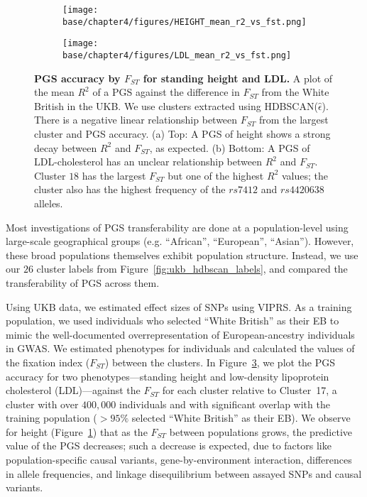 \begin{figure}[ht]
  \centering
  \begin{subfigure}[b]{0.6\linewidth}
    \texttt{[image: base/chapter4/figures/HEIGHT\_mean\_r2\_vs\_fst.png]}
    \caption{}
    \label{fig:fst_vs_r2_height}
  \end{subfigure}
    \begin{subfigure}[b]{0.6\linewidth}
    \texttt{[image: base/chapter4/figures/LDL\_mean\_r2\_vs\_fst.png]}
    \caption{}
    \label{fig:fst_vs_r2_ldl}
  \end{subfigure}
  \caption[PGS accuracy by $F_{ST}$]{\textbf{PGS accuracy by $F_{ST}$ for standing height and LDL.}  A plot of the mean $R^2$ of a PGS against the difference in $F_{ST}$ from the White British in the UKB. We use clusters extracted using HDBSCAN($\hat{\epsilon}$). There is a negative linear relationship between $F_{ST}$ from the largest cluster and PGS accuracy. (a) Top: A PGS of height shows a strong decay between $R^2$ and $F_{ST}$, as expected. (b) Bottom: A PGS of LDL-cholesterol has an unclear relationship between $R^2$ and $F_{ST}$. Cluster $18$ has the largest $F_{ST}$ but one of the highest $R^2$ values; the cluster also has the highest frequency of the $rs7412$ and $rs4420638$ alleles.} 
  \label{fig:fst_vs_r2}
\end{figure}

Most investigations of PGS transferability are done at a population-level using large-scale geographical groups (e.g. ``African'', ``European'', ``Asian''). However, these broad populations themselves exhibit population structure\citep{kamiza_transferability_2022}. Instead, we use our $26$ cluster labels from Figure~\ref{fig:ukb_hdbscan_labels}, and compared the transferability of PGS across them. 

Using UKB data, we estimated effect sizes of SNPs using VIPRS\citep{zabad_fast_2023}. As a training population, we used individuals who selected ``White British'' as their EB to mimic the well-documented overrepresentation of European-ancestry individuals in GWAS. We estimated phenotypes for individuals and calculated the values of the fixation index ($F_{ST}$) between the clusters. In Figure~\ref{fig:fst_vs_r2}, we plot the PGS accuracy for two phenotypes---standing height and low-density lipoprotein cholesterol (LDL)---against the $F_{ST}$ for each cluster relative to Cluster~17, a cluster with over $400,000$ individuals and with significant overlap with the training population ($>95\%$ selected ``White British'' as their EB). We observe for height (Figure~\ref{fig:fst_vs_r2_height}) that as the $F_{ST}$ between populations grows, the predictive value of the PGS decreases; such a decrease is expected, due to factors like population-specific causal variants, gene-by-environment interaction, differences in allele frequencies, and linkage disequilibrium between assayed SNPs and causal variants\citep{wang_theoretical_2020}.

